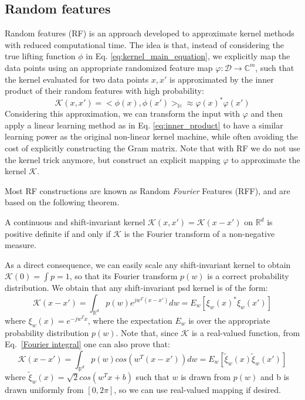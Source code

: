 \subsection{Random features}
Random features (RF) \citep{rahimi2008random} is an approach developed to approximate kernel methods with reduced computational time. The idea is that, instead of considering the true lifting function $\phi$ in Eq. \ref{eq:kernel_main_equation}, we explicitly map the data points using an appropriate randomized feature map $\varphi:\mathcal{D} \xrightarrow{}\mathbb{C}^m$, such that the kernel evaluated for two data points $x, x'$ is approximated by the inner product of their random features with high probability:
\begin{equation}
\label{eq:approx_RF}
\mathcal{K}(x,x')=<\phi(x),\phi(x')>_\mathbb{H} \approx \varphi(x)^*\varphi(x')
\end{equation}
Considering this approximation, we can transform the input with $\varphi$ and then apply a linear learning method as in Eq. \ref{eq:inner_product} to have a similar learning power as the original non-linear kernel machine, while often avoiding the cost of explicitly constructing the Gram matrix. Note that with RF we do not use the kernel trick anymore, but construct an explicit mapping $\varphi$ to approximate the kernel $\mathcal{K}$.

Most RF constructions are known as Random \emph{Fourier} Features (RFF), and are based on the following theorem.
\begin{theorem}
A continuous and shift-invariant kernel $\mathcal{K}(x,x')=\mathcal{K}(x-x')$ on $\mathbb{R}^d$ is positive definite if and only if $\mathcal{K}$ is the Fourier transform of a non-negative measure.
\end{theorem}
As a direct consequence, we can easily scale any shift-invariant kernel to obtain $\mathcal{K}(0) = \int p = 1$, so that its Fourier transform $p(w)$ is a correct probability distribution. We obtain that any shift-invariant psd kernel is of the form:
\begin{equation}
\label{Fourier integral}
\mathcal{K}(x-x')=\int_{\mathbb{R}^d}p(w)e^{jw^T(x-x')}dw= E_w[\xi_w(x)^*\xi_w(x')]
\end{equation}
where $\xi_w(x)=e^{-jw^Tx}$, where the expectation $E_w$ is over the appropriate probability distribution $p(w)$. Note that, since $\mathcal{K}$ is a real-valued function, from Eq.~\ref{Fourier integral} one can also prove that:
\begin{equation}
\label{real Fourier integral}
\mathcal{K}(x-x')=\int_{\mathbb{R}^d}p(w)cos({w^T(x-x')})dw=E_w[\tilde \xi_w(x)\tilde \xi_w(x')]
\end{equation}
where $\tilde \xi_w(x)=\sqrt{2}cos(w^Tx+b)$ such that $w$ is drawn from $p(w)$ and b is drawn uniformly from $[0,2\pi]$, so we can use real-valued mapping if desired.

